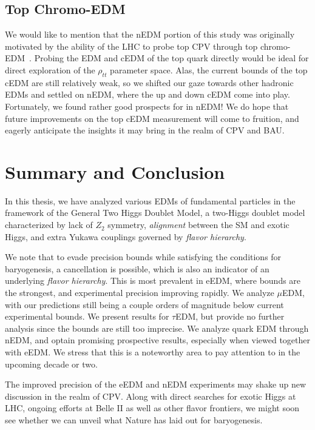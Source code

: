 \subsection{Top Chromo-EDM}\label{sec:top-cedm}
We would like to mention that the nEDM portion of this study was originally motivated by the ability of the LHC to probe top CPV through top chromo-EDM~\cite{CMS2023}.
Probing the EDM and cEDM of the top quark directly would be ideal for direct exploration of the \(\rho_{tt} \) parameter space.
Alas, the current bounds of the top cEDM are still relatively weak, so we shifted our gaze towards other hadronic EDMs and settled on nEDM, 
where the up and down cEDM come into play.
Fortunately, we found rather good prospects for {\gthdm} in nEDM!
We do hope that future improvements on the top cEDM measurement will come to fruition,
and eagerly anticipate the insights it may bring in the realm of CPV and BAU.

\section{Summary and Conclusion}
In this thesis, we have analyzed various EDMs of fundamental particles in the framework of  the General Two Higgs Doublet Model,
a two-Higgs doublet model characterized by lack of \(Z_{2} \) symmetry, \textit{alignment} between the SM and exotic Higgs, and extra Yukawa couplings governed by \textit{flavor hierarchy}.

We note that to evade precision bounds while satisfying the conditions for baryogenesis, a cancellation is possible,
which is also an indicator of an underlying \textit{flavor hierarchy}.
This is most prevalent in eEDM, where bounds are the strongest, and experimental precision improving rapidly.
We analyze \(\mu \)EDM, with our predictions still being a couple orders of magnitude below current experimental bounds.
We present results for \(\tau \)EDM, but provide no further analysis since the bounds are still too imprecise.
We analyze quark EDM through nEDM, and optain promising prospective results, especially when viewed together with eEDM.
We stress that this is a noteworthy area to pay attention to in the upcoming decade or two.

The improved precision of the eEDM and nEDM experiments may shake up new discussion in the realm of CPV.
Along with direct searches for exotic Higgs at LHC, ongoing efforts at Belle II as well as other flavor frontiers,
we might soon see whether we can unveil what Nature has laid out for baryogenesis.